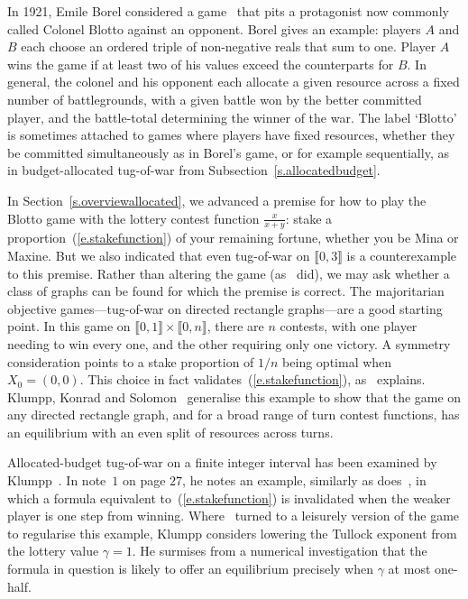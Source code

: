 \documentclass[letterpaper,11pt,oneside,reqno]{amsbook}
\numberwithin{figure}{chapter}
\theoremstyle{definition}
\theoremstyle{definition}
\theoremstyle{definition}
\theoremstyle{definition}
\theoremstyle{definition}
\begin{document}
 In 1921, Emile Borel considered a game~\cite{Borel1921} that pits a protagonist now commonly called Colonel Blotto against an opponent. Borel gives an example: players $A$ and $B$ each choose an ordered triple of non-negative reals that sum to one. Player $A$ wins the game if at least two of his values exceed the counterparts for $B$. In general, the colonel and his opponent each allocate a given resource across a fixed number of battlegrounds, with a given battle won by the better committed player, and the battle-total determining the winner of the war. 
 The label `Blotto' is sometimes attached to games where players have fixed resources, whether they be committed simultaneously as in Borel's game, or for example sequentially, as in budget-allocated tug-of-war from Subsection~\ref{s.allocatedbudget}. 
 
 In Section~\ref{s.overviewallocated}, we advanced a premise for how to play the Blotto game with the lottery contest function $\tfrac{x}{x+y}$: stake a proportion~(\ref{e.stakefunction}) of your remaining fortune, whether you be Mina or Maxine. But we also indicated that even tug-of-war on $\llbracket 0,3 \rrbracket$ is a counterexample to this premise. Rather than altering the game (as~\cite{HP2022} did), we may ask whether a class of graphs can be found for which the premise is correct. The majoritarian objective games---tug-of-war on directed rectangle graphs---are a good starting point. In this game on  $\llbracket 0,1 \rrbracket \times \llbracket 0,n \rrbracket$, there are $n$ contests, with one player needing to win every one, and the other requiring only one victory. A symmetry consideration points to a stake proportion of $1/n$ being optimal 
 when $X_0 = (0,0)$. This choice in fact validates~(\ref{e.stakefunction}), as~\cite[Section~$2.6$]{HP2022} explains.  Klumpp, Konrad and Solomon~\cite{KlumpKonradSolomon} generalise this example to show that the game on any directed rectangle graph, and for a broad range of turn contest functions, has an equilibrium with an even split of resources across turns. 
 
 Allocated-budget tug-of-war on a finite integer interval has been examined by Klumpp~\cite{Klumpp}. In note~$1$ on page $27$, he notes an example, similarly as does~\cite{HP2022}, in which a formula equivalent to~(\ref{e.stakefunction})
 is invalidated when the weaker player is one step from winning. Where~\cite{HP2022} turned to a leisurely version of the game to regularise this example, Klumpp considers lowering the Tullock exponent from the lottery value $\gamma = 1$. He surmises from a numerical investigation that the formula in question is likely to offer an equilibrium precisely when $\gamma$ at most one-half. 
\end{document}
